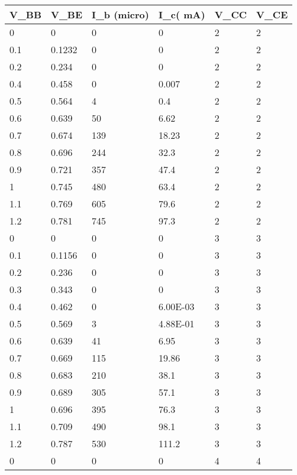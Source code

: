 \begin{table}[!ht]
    \centering
    \begin{tabular}{|l|l|l|l|l|l|}
    \hline
        \textbf{V\_BB} & \textbf{V\_BE} & \textbf{I\_b (micro)} & \textbf{I\_c( mA)} & \textbf{V\_CC} & \textbf{V\_CE} \\ \hline
        0 & 0 & 0 & 0 & 2 & 2 \\ \hline
        0.1 & 0.1232 & 0 & 0 & 2 & 2 \\ \hline
        0.2 & 0.234 & 0 & 0 & 2 & 2 \\ \hline
        0.4 & 0.458 & 0 & 0.007 & 2 & 2 \\ \hline
        0.5 & 0.564 & 4 & 0.4 & 2 & 2 \\ \hline
        0.6 & 0.639 & 50 & 6.62 & 2 & 2 \\ \hline
        0.7 & 0.674 & 139 & 18.23 & 2 & 2 \\ \hline
        0.8 & 0.696 & 244 & 32.3 & 2 & 2 \\ \hline
        0.9 & 0.721 & 357 & 47.4 & 2 & 2 \\ \hline
        1 & 0.745 & 480 & 63.4 & 2 & 2 \\ \hline
        1.1 & 0.769 & 605 & 79.6 & 2 & 2 \\ \hline
        1.2 & 0.781 & 745 & 97.3 & 2 & 2 \\ \hline
        0 & 0 & 0 & 0 & 3 & 3 \\ \hline
        0.1 & 0.1156 & 0 & 0 & 3 & 3 \\ \hline
        0.2 & 0.236 & 0 & 0 & 3 & 3 \\ \hline
        0.3 & 0.343 & 0 & 0 & 3 & 3 \\ \hline
        0.4 & 0.462 & 0 & 6.00E-03 & 3 & 3 \\ \hline
        0.5 & 0.569 & 3 & 4.88E-01 & 3 & 3 \\ \hline
        0.6 & 0.639 & 41 & 6.95 & 3 & 3 \\ \hline
        0.7 & 0.669 & 115 & 19.86 & 3 & 3 \\ \hline
        0.8 & 0.683 & 210 & 38.1 & 3 & 3 \\ \hline
        0.9 & 0.689 & 305 & 57.1 & 3 & 3 \\ \hline
        1 & 0.696 & 395 & 76.3 & 3 & 3 \\ \hline
        1.1 & 0.709 & 490 & 98.1 & 3 & 3 \\ \hline
        1.2 & 0.787 & 530 & 111.2 & 3 & 3 \\ \hline
        0 & 0 & 0 & 0 & 4 & 4 \\ \hline

\end{tabular}
\end{table}

